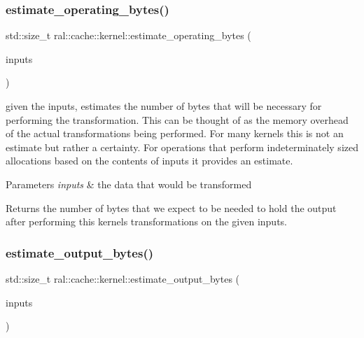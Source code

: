 \subsubsection{\texorpdfstring{estimate\+\_\+operating\+\_\+bytes()}{estimate\_operating\_bytes()}}
{\footnotesize\ttfamily std\+::size\+\_\+t ral\+::cache\+::kernel\+::estimate\+\_\+operating\+\_\+bytes (\begin{DoxyParamCaption}\item[{const std\+::vector$<$ std\+::unique\+\_\+ptr$<$ \hyperlink{classral_1_1cache_1_1CacheData}{ral\+::cache\+::\+Cache\+Data} $>$ $>$ \&}]{inputs }\end{DoxyParamCaption})}



given the inputs, estimates the number of bytes that will be necessary for performing the transformation. This can be thought of as the memory overhead of the actual transformations being performed. For many kernels this is not an estimate but rather a certainty. For operations that perform indeterminately sized allocations based on the contents of inputs it provides an estimate. 


\begin{DoxyParams}{Parameters}
{\em inputs} & the data that would be transformed \\
\hline
\end{DoxyParams}
\begin{DoxyReturn}{Returns}
the number of bytes that we expect to be needed to hold the output after performing this kernels transformations on the given inputs. 
\end{DoxyReturn}
\mbox{\label{classral_1_1cache_1_1kernel_a37da9a64d455f2b833e1e7576c9a17d2}} 
\subsubsection{\texorpdfstring{estimate\+\_\+output\+\_\+bytes()}{estimate\_output\_bytes()}}
{\footnotesize\ttfamily std\+::size\+\_\+t ral\+::cache\+::kernel\+::estimate\+\_\+output\+\_\+bytes (\begin{DoxyParamCaption}\item[{const std\+::vector$<$ std\+::unique\+\_\+ptr$<$ \hyperlink{classral_1_1cache_1_1CacheData}{ral\+::cache\+::\+Cache\+Data} $>$ $>$ \&}]{inputs }\end{DoxyParamCaption})}



